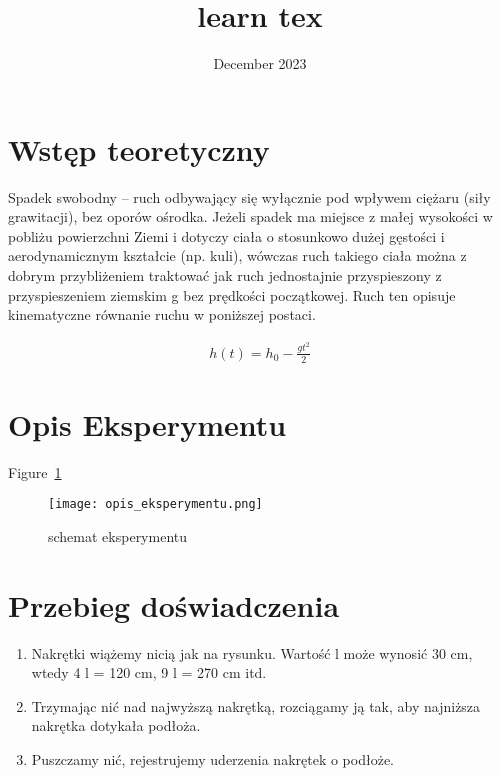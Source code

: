 \documentclass{article}
\title{learn tex}
\date{December 2023}
\begin{document}
	
	\maketitle
	
	\section{Wstęp teoretyczny}
	Spadek swobodny – ruch odbywający się wyłącznie pod wpływem ciężaru (siły grawitacji), bez oporów ośrodka. Jeżeli spadek ma miejsce z małej wysokości w pobliżu powierzchni Ziemi i dotyczy ciała o stosunkowo dużej gęstości i aerodynamicznym kształcie (np. kuli), wówczas ruch takiego ciała można z dobrym przybliżeniem traktować jak ruch jednostajnie przyspieszony z przyspieszeniem ziemskim g bez prędkości początkowej. Ruch ten opisuje kinematyczne równanie ruchu w poniższej postaci.
	
	\begin{equation} \label{eq1}
		\begin{split}
			h\left(t\right)=h_0-\frac{gt^2}{2}
		\end{split}
	\end{equation}
	
	\section{Opis Eksperymentu}
	
	Figure~\ref{schemat eksperymentu}
	\begin{figure}[!htbp]
		\centering
		\texttt{[image: opis\_eksperymentu.png]}
		\caption{schemat eksperymentu}
		\label{schemat eksperymentu}
	\end{figure}
	
	\section{Przebieg doświadczenia}
	
	\begin{enumerate}
		\item Nakrętki wiążemy nicią jak na rysunku. Wartość l może wynosić 30 cm, wtedy 4 l = 120 cm, 9 l = 270 cm itd.
		\item Trzymając nić nad najwyższą nakrętką, rozciągamy ją tak, aby najniższa nakrętka dotykała podłoża.
		\item Puszczamy nić, rejestrujemy uderzenia nakrętek o podłoże.
	\end{enumerate}
	
\end{document}
